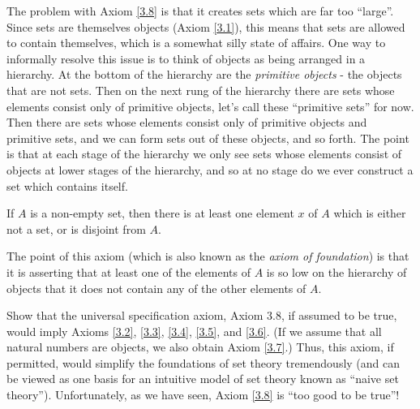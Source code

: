 \begin{note}
The problem with Axiom \ref{3.8} is that it creates sets which are far too ``large''.
Since sets are themselves objects (Axiom \ref{3.1}), this means that sets are allowed to contain themselves, which is a somewhat silly state of affairs.
One way to informally resolve this issue is to think of objects as being arranged in a hierarchy.
At the bottom of the hierarchy are the \emph{primitive objects} - the objects that are not sets.
Then on the next rung of the hierarchy there are sets whose elements consist only of primitive objects, let’s call these ``primitive sets'' for now.
Then there are sets whose elements consist only of primitive objects and primitive sets, and we can form sets out of these objects, and so forth.
The point is that at each stage of the hierarchy we only see sets whose elements consist of objects at lower stages of the hierarchy, and so at no stage do we ever construct a set which contains itself.
\end{note}

\begin{axiom}[Regularity]\label{3.9}
If \(A\) is a non-empty set, then there is at least one element \(x\) of \(A\) which is either not a set, or is disjoint from \(A\).
\end{axiom}

\begin{note}
The point of this axiom (which is also known as the \emph{axiom of foundation}) is that it is asserting that at least one of the elements of \(A\) is so low on the hierarchy of objects that it does not contain any of the other elements of \(A\).
\end{note}

\exercisesection

\begin{exercise}\label{ex 3.2.1}
Show that the universal specification axiom, Axiom 3.8, if assumed to be true, would imply Axioms \ref{3.2}, \ref{3.3}, \ref{3.4}, \ref{3.5}, and \ref{3.6}.
(If we assume that all natural numbers are objects, we also obtain Axiom \ref{3.7}.)
Thus, this axiom, if permitted, would simplify the foundations of set theory tremendously (and can be viewed as one basis for an intuitive model of set theory known as ``naive set theory'').
Unfortunately, as we have seen, Axiom \ref{3.8} is ``too good to be true''!
\end{exercise}

